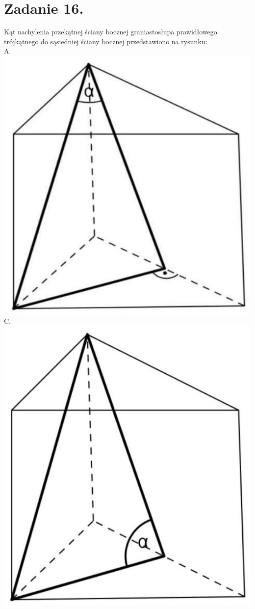 \documentclass[10pt]{article}
\begin{document}
\section*{Zadanie 16.}
Kąt nachylenia przekątnej ściany bocznej graniastosłupa prawidłowego trójkątnego do sąsiedniej ściany bocznej przedstawiono na rysunku:\\
A.\\
\includegraphics[max width=\textwidth, center]{2024_11_21_94f02db55673a8a7b820g-08(1)}\\
C.\\
\includegraphics[max width=\textwidth, center]{2024_11_21_94f02db55673a8a7b820g-08(2)}\\
\end{document}
